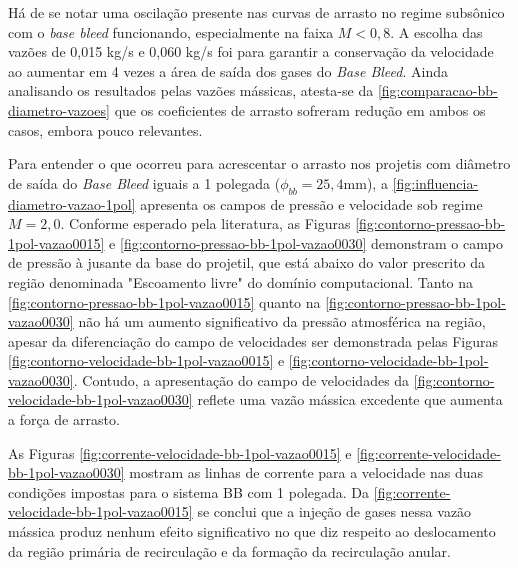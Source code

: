 Há de se notar uma oscilação presente nas curvas de arrasto no regime subsônico com o \textit{base bleed} funcionando, especialmente na faixa $M < 0,8$. A escolha das vazões de 0,015 kg/s e 0,060 kg/s foi para garantir a conservação da velocidade ao aumentar em 4 vezes a área de saída dos gases do \textit{Base Bleed}. Ainda analisando os resultados pelas vazões mássicas, atesta-se da \autoref{fig:comparacao-bb-diametro-vazoes} que os coeficientes de arrasto sofreram redução em ambos os casos, embora pouco relevantes.

Para entender o que ocorreu para acrescentar o arrasto nos projetis com diâmetro de saída do \textit{Base Bleed} iguais a 1 polegada ($\phi_{bb} = 25,4 \unit{\mm}$), a \autoref{fig:influencia-diametro-vazao-1pol} apresenta os campos de pressão e velocidade sob regime $M = 2,0$. Conforme esperado pela literatura, as Figuras \ref{fig:contorno-pressao-bb-1pol-vazao0015} e \ref{fig:contorno-pressao-bb-1pol-vazao0030} demonstram o campo de pressão à jusante da base do projetil, que está abaixo do valor prescrito da região denominada "Escoamento livre"{} do domínio computacional. Tanto na \autoref{fig:contorno-pressao-bb-1pol-vazao0015} quanto na \autoref{fig:contorno-pressao-bb-1pol-vazao0030} não há um aumento significativo da pressão atmosférica na região, apesar da diferenciação do campo de velocidades ser demonstrada pelas Figuras \ref{fig:contorno-velocidade-bb-1pol-vazao0015} e \ref{fig:contorno-velocidade-bb-1pol-vazao0030}. Contudo, a apresentação do campo de velocidades da \autoref{fig:contorno-velocidade-bb-1pol-vazao0030} reflete uma vazão mássica excedente que aumenta a força de arrasto.

As Figuras \ref{fig:corrente-velocidade-bb-1pol-vazao0015} e \ref{fig:corrente-velocidade-bb-1pol-vazao0030} mostram as linhas de corrente para a velocidade nas duas condições impostas para o sistema BB com 1 polegada. Da \autoref{fig:corrente-velocidade-bb-1pol-vazao0015} se conclui que a injeção de gases nessa vazão mássica produz nenhum efeito significativo no que diz respeito ao deslocamento da região primária de recirculação e da formação da recirculação anular.

